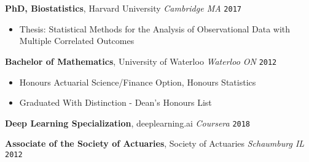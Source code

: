 \documentclass[10pt,english]{report}
\begin{document}
\textbf{PhD, Biostatistics}, Harvard University \hfill \textit{Cambridge MA} \texttt{\quad \phantom{00/0000-00/}2017}
\begin{itemize}
    \item Thesis: Statistical Methods for the Analysis of Observational Data with Multiple Correlated Outcomes
\end{itemize}

\textbf{Bachelor of Mathematics}, University of Waterloo \hfill \textit{Waterloo ON} \texttt{\quad \phantom{00/0000-00/}2012}
\begin{itemize}
    \item Honours Actuarial Science/Finance Option, Honours Statistics
    \item Graduated With Distinction - Dean's Honours List
\end{itemize}

\textbf{Deep Learning Specialization}, deeplearning.ai \hfill \textit{Coursera} \texttt{\quad \phantom{00/0000-00/}2018}

\textbf{Associate of the Society of Actuaries}, Society of Actuaries \hfill \textit{Schaumburg IL} \texttt{\quad \phantom{00/0000-00/}2012}
\end{document}
